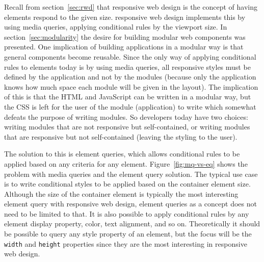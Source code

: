 \documentclass[a4paper,11pt]{kth-mag}
\newcommand{\code}[1]{\texttt{#1}}
\begin{document}
      Recall from section~\ref{sec:rwd} that \gls{responsive} \gls{web} design is the concept of having \glspl{element} respond to the given size.
      \Gls{responsive} \gls{web} design implements this by using \gls{media queries}, applying conditional rules by the \gls{viewport} size.
      In section~\ref{sec:modularity} the desire for building modular \gls{web} components was presented.
      One implication of building applications in a modular way is that general components become reusable.
      Since the only way of applying conditional rules to \glspl{element} today is by using \gls{media queries}, all \gls{responsive} styles must be defined by the application and not by the modules (because only the application knows how much space each module will be given in the layout).
      The implication of this is that the \gls{HTML} and \gls{JavaScript} can be written in a modular way, but the \gls{CSS} is left for the user of the module (application) to write which somewhat defeats the purpose of writing modules.
      So developers today have two choices: writing modules that are not \gls{responsive} but \gls{self-contained}, or writing modules that are \gls{responsive} but not \gls{self-contained} (leaving the styling to the user).

      The solution to this is element queries, which allows conditional rules to be applied based on any criteria for any \gls{element}.
      Figure~\ref{fig:mq-vs-eq} shows the problem with \gls{media queries} and the element query solution.
      The typical use case is to write conditional styles to be applied based on the container \gls{element} size.
      Although the size of the container \gls{element} is typically the most interesting element query with \gls{responsive} \gls{web} design, element queries as a concept does not need to be limited to that.
      It is also possible to apply conditional rules by any \gls{element} display property, color, text alignment, and so on.
      Theoretically it should be possible to query any style property of an \gls{element}, but the focus will be the \code{width} and \code{height} properties since they are the most interesting in \gls{responsive} \gls{web} design.
\end{document}
